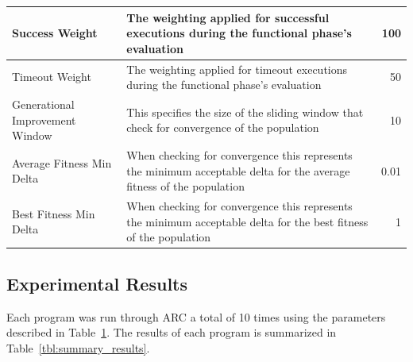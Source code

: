 \documentclass{llncs}
\begin{document}
\begin{table}[h]
\begin{center}
\begin{tabular}{|p{3cm}|p{10cm}|r|}
\hline
Success Weight & The weighting applied for successful executions during the functional phase's evaluation & 100\\
\hline
Timeout Weight & The weighting applied for timeout executions during the functional phase's evaluation & 50\\
\hline
Generational Improvement Window & This specifies the size of the sliding window that check for convergence of the population & 10\\
\hline
Average Fitness Min Delta & When checking for convergence this represents the minimum acceptable delta for the average fitness of the population & 0.01\\
\hline
Best Fitness Min Delta & When checking for convergence this represents the minimum acceptable delta for the best fitness of the population & 1\\
\hline
\end{tabular}
\label{tbl:used_parameters}
\end{center}
\end{table}

\subsection{Experimental Results}
\label{sec:experimental_results}

Each program was run through ARC a total of 10 times using the parameters
described in Table~\ref{tbl:used_parameters}. The results of each program is
summarized in Table~\ref{tbl:summary_results}.

\end{document}
